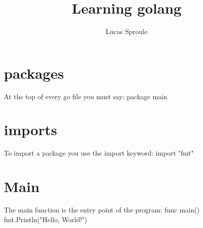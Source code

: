 \documentclass{article}
\title{Learning golang}
\author{Lucas Sproule}
\newenvironment{code}{\footnotesize\verbatim}{\endverbatim\normalsize}
\begin{document}
  \maketitle
\section{packages}{
  At the top of every go file you must say:
  \begin{code}
    package main
  \end{code}
}
\section{imports}{
  To import a package you use the import keyword:
  \begin{code}
    import "fmt"
  \end{code}
}

\section{Main}{
  The main function is the entry point of the program:
  \begin{code}
    func main() {
      fmt.Println("Hello, World!")
    }
  \end{code}
}
\end{document}
